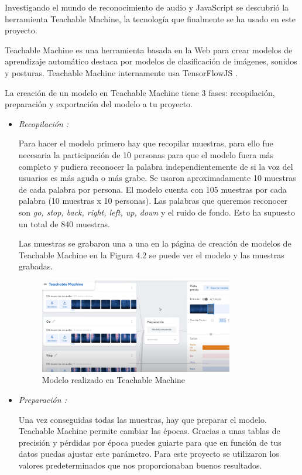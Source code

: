 Investigando el mundo de reconocimiento de audio y JavaScript se descubrió la herramienta Teachable Machine, la tecnología  que finalmente se ha usado en este proyecto.

Teachable Machine es una herramienta basada en la Web para crear modelos de aprendizaje automático destaca por modelos de clasificación de imágenes, sonidos y posturas. Teachable Machine internamente usa TensorFlowJS . 

La creación de un modelo en Teachable Machine tiene 3 fases: recopilación, preparación y exportación del modelo a tu proyecto.

\begin{itemize}
\item \textit{Recopilación :}

Para hacer el modelo primero hay que recopilar muestras, para ello fue necesaria la participación de 10 personas para que el modelo fuera más completo y pudiera reconocer la palabra independientemente de si la voz del usuarios es más aguda o más grabe.  Se usaron aproximadamente 10 muestras de cada palabra por persona. El modelo cuenta con 105 muestras por cada palabra (10 muestras x 10 personas). Las palabras que queremos reconocer son \textit{go, stop, back, right, left, up, down } y el ruido de fondo. Esto ha supuesto un total de 840 muestras.

Las muestras se grabaron una a una en la página de creación de modelos de Teachable Machine en la Figura 4.2 se puede ver el modelo y las muestras grabadas.


\begin{figure}[H]
 \centering
    \includegraphics[width=0.8\textwidth, height=0.4\textwidth]{chapters/images/teachablemachine.png}
    \caption{Modelo realizado en Teachable Machine}
\end{figure}
 

\item  \textit{Preparación :}

Una vez conseguidas todas las muestras, hay que preparar el modelo. Teachable Machine permite cambiar las épocas. Gracias a unas tablas de precisión y pérdidas por época puedes guiarte para que en función de tus datos puedas ajustar este parámetro. Para este proyecto se utilizaron los valores predeterminados que nos proporcionaban buenos resultados.


\end{itemize}
